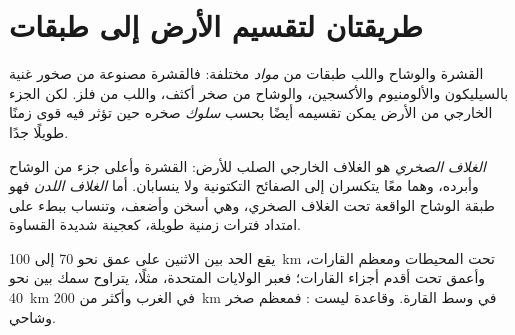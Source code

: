 \section{طريقتان لتقسيم الأرض إلى طبقات}

القشرة والوشاح واللب طبقات من \emph{مواد}
مختلفة: فالقشرة مصنوعة من صخور غنية بالسيليكون والألومنيوم
والأكسجين، والوشاح من صخر أكثف، واللب من فلز. لكن الجزء الخارجي من
الأرض يمكن تقسيمه أيضًا بحسب \emph{سلوك} صخره حين تؤثر فيه قوى
زمنًا طويلًا جدًا.

\begin{definition}\label{def:g11:lithosphere-asthenosphere:lithosphere}
\emph{الغلاف الصخري} هو الغلاف الخارجي الصلب
للأرض: القشرة وأعلى جزء من الوشاح وأبرده، وهما معًا
يتكسران إلى الصفائح التكتونية ولا ينسابان. أما
\emph{الغلاف اللدن} فهو طبقة الوشاح الواقعة تحت
الغلاف الصخري، وهي أسخن وأضعف، وتنساب
ببطء على امتداد فترات زمنية طويلة، كعجينة شديدة القساوة.
\end{definition}

يقع الحد بين الاثنين على عمق نحو 70 إلى \qty{100}{km} تحت
المحيطات ومعظم القارات، وأعمق تحت أقدم أجزاء
القارات؛ فعبر الولايات المتحدة، مثلًا، يتراوح سمك  بين
نحو \qty{40}{km} في الغرب وأكثر من \qty{200}{km} في
وسط القارة. وقاعدة  ليست : فمعظم
 صخر وشاحي.


